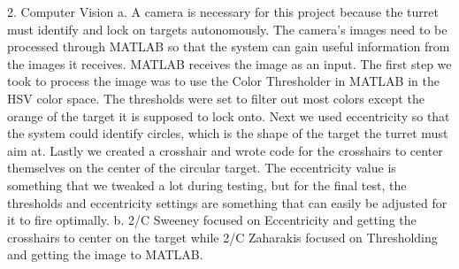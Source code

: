     2. Computer Vision
        a. A camera is necessary for this project because the turret must identify and lock on targets autonomously. The camera’s images need to be processed through MATLAB so that the system can gain useful information from the images it receives. MATLAB receives the image as an input. The first step we took to process the image was to use the Color Thresholder in MATLAB in the HSV color space. The thresholds were set to filter out most colors except the orange of the target it is supposed to lock onto. Next we used eccentricity so that the system could identify circles, which is the shape of the target the turret must aim at. Lastly we created a crosshair and wrote code for the crosshairs to center themselves on the center of the circular target. The eccentricity value is something that we tweaked a lot during testing, but for the final test, the thresholds and eccentricity settings are something that can easily be adjusted for it to fire optimally. 
        b. 2/C Sweeney focused on Eccentricity and getting the crosshairs to center on the target while 2/C Zaharakis focused on Thresholding and getting the image to MATLAB.
